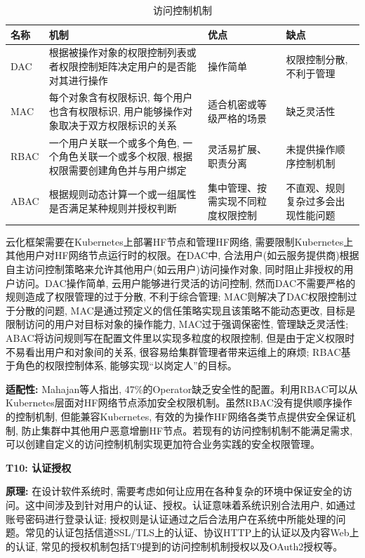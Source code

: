 {\footnotesize
\begin{longtable}[h]{m{20pt} m{200pt} m{60pt} m{60pt}}
    \caption[访问控制机制]{访问控制机制} \label{access_control} \\
        \toprule  
        \textbf{名称}&\textbf{机制}&\textbf{优点}&\textbf{缺点}\\
        \hline
        DAC & 根据被操作对象的权限控制列表或者权限控制矩阵决定用户的是否能对其进行操作 & 操作简单 & 权限控制分散, 不利于管理 \\

        MAC & 每个对象含有权限标识, 每个用户也含有权限标识, 用户能够操作对象取决于双方权限标识的关系 & 适合机密或等级严格的场景 & 缺乏灵活性 \\

        RBAC & 一个用户关联一个或多个角色, 一个角色关联一个或多个权限, 根据权限需要创建角色并与用户绑定 & 灵活易扩展、职责分离 & 未提供操作顺序控制机制 \\

        ABAC & 根据规则动态计算一个或一组属性是否满足某种规则并授权判断 & 集中管理、按需实现不同粒度权限控制 & 不直观、规则复杂过多会出现性能问题 \\
        \bottomrule
    \end{longtable}
}

云化框架需要在Kubernetes上部署HF节点和管理HF网络, 需要限制Kubernetes上其他用户对HF网络节点运行时的权限。在DAC中, 合法用户(如云服务提供商)根据自主访问控制策略来允许其他用户(如云用户)访问操作对象\cite{lopez2018access}, 同时阻止非授权的用户访问。DAC操作简单, 云用户能够进行灵活的访问控制, 然而DAC不需要严格的规则造成了权限管理的过于分散, 不利于综合管理; MAC则解决了DAC权限控制过于分散的问题, MAC是通过预定义的信任策略实现且该策略不能动态更改, 目标是限制访问的用户对目标对象的操作能力, MAC过于强调保密性, 管理缺乏灵活性; ABAC将访问规则写在配置文件里以实现多粒度的权限控制, 但是由于定义权限时不易看出用户和对象间的关系, 很容易给集群管理者带来运维上的麻烦; RBAC基于角色的权限控制体系, 能够实现“以岗定人”的目标。


\textbf{适配性: }Mahajan等人\cite{mahajan2020suture}指出, 47\%的Operator缺乏安全性的配置。利用RBAC可以从Kubernetes层面对HF网络节点添加安全权限机制。虽然RBAC没有提供顺序操作的控制机制, 但能兼容Kubernetes, 有效的为操作HF网络各类节点提供安全保证机制, 防止集群中其他用户恶意增删HF节点。若现有的访问控制机制不能满足需求, 可以创建自定义的访问控制机制实现更加符合业务实践的安全权限管理。

\textbf{T10: 认证授权}

\textbf{原理: }在设计软件系统时, 需要考虑如何让应用在各种复杂的环境中保证安全的访问。这中间涉及到针对用户的认证、授权。认证意味着系统识别合法用户, 如通过账号密码进行登录认证; 授权则是认证通过之后合法用户在系统中所能处理的问题。常见的认证包括信道SSL/TLS上的认证、协议HTTP上的认证以及内容Web上的认证, 常见的授权机制包括T9提到的访问控制机制授权以及OAuth2授权等。

